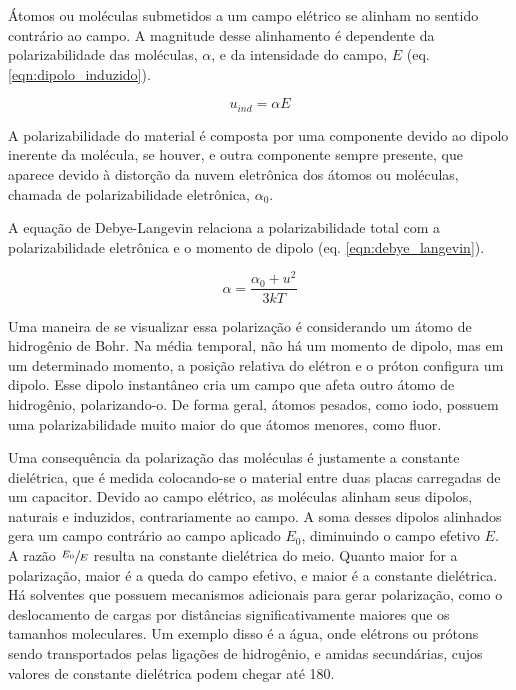 	Átomos ou moléculas submetidos a um campo elétrico se alinham no sentido contrário ao campo. A magnitude desse alinhamento é dependente da polarizabilidade das moléculas, \(\alpha\), e da intensidade do campo, \(E\)  (eq. \ref{eqn:dipolo_induzido}).
	
	\begin{equation}
		u_{ind} = \alpha E
		\label{eqn:dipolo_induzido}
	\end{equation}
	
	A polarizabilidade do material é composta por uma componente devido ao dipolo inerente da molécula, se houver, e outra componente sempre presente, que aparece devido à distorção da nuvem eletrônica dos átomos ou moléculas, chamada de polarizabilidade eletrônica, \(\alpha_0\).
	
	A equação de Debye-Langevin relaciona a polarizabilidade total com a polarizabilidade eletrônica e o momento de dipolo (eq. \ref{eqn:debye_langevin}).
	
	\begin{equation}
		\alpha = \dfrac{\alpha _ { 0 } + u ^ { 2 }}{ 3 k T }
		\label{eqn:debye_langevin}
	\end{equation}
	
	Uma maneira de se visualizar essa polarização é considerando um átomo de hidrogênio de Bohr. Na média temporal, não há um momento de dipolo, mas em um determinado momento, a posição relativa do elétron e o próton configura um dipolo. Esse dipolo instantâneo cria um campo que afeta outro átomo de hidrogênio, polarizando-o. De forma geral, átomos pesados, como iodo, possuem uma polarizabilidade muito maior do que átomos menores, como fluor.
	
	Uma consequência da polarização das moléculas é justamente a constante dielétrica, que é medida colocando-se o material entre duas placas carregadas de um capacitor. Devido ao campo elétrico, as moléculas alinham seus dipolos, naturais e induzidos, contrariamente ao campo. A soma desses dipolos alinhados gera um campo contrário ao campo aplicado \(E_0\), diminuindo o campo efetivo \(E\). A razão \(\sfrac{E_0}{E}\) resulta na constante dielétrica do meio. Quanto maior for a polarização, maior é a queda do campo efetivo, e maior é a constante dielétrica. Há solventes que possuem mecanismos adicionais para gerar polarização, como o deslocamento de cargas por distâncias significativamente maiores que os tamanhos moleculares. Um exemplo disso é a água, onde elétrons ou prótons sendo transportados pelas ligações de hidrogênio, e amidas secundárias, cujos valores de constante dielétrica podem chegar até 180.
	
